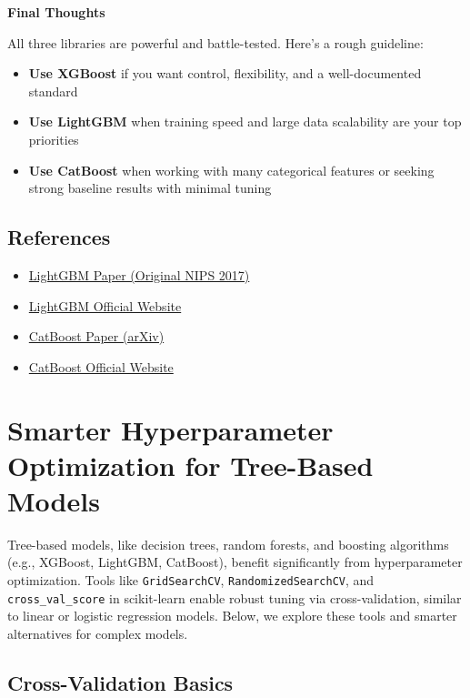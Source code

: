 \documentclass[
  letterpaper,
  DIV=11,
  numbers=noendperiod]{scrreprt}
\providecommand{\tightlist}{%
  \setlength{\itemsep}{0pt}\setlength{\parskip}{0pt}}\usepackage{longtable,booktabs,array}
\begin{document}
\textbf{Final Thoughts}

All three libraries are powerful and battle-tested. Here's a rough
guideline:

\begin{itemize}
\tightlist
\item
  \textbf{Use XGBoost} if you want control, flexibility, and a
  well-documented standard
\item
  \textbf{Use LightGBM} when training speed and large data scalability
  are your top priorities
\item
  \textbf{Use CatBoost} when working with many categorical features or
  seeking strong baseline results with minimal tuning
\end{itemize}

\section{References}\label{references}

\begin{itemize}
\tightlist
\item
  \href{https://papers.nips.cc/paper_files/paper/2017/file/6449f44a102fde848669bdd9eb6b76fa-Paper.pdf}{LightGBM
  Paper (Original NIPS 2017)}
\item
  \href{https://lightgbm.readthedocs.io/}{LightGBM Official Website}
\item
  \href{https://arxiv.org/abs/1810.11363}{CatBoost Paper (arXiv)}
\item
  \href{https://catboost.ai/}{CatBoost Official Website}
\end{itemize}

\chapter{Smarter Hyperparameter Optimization for Tree-Based
Models}\label{smarter-hyperparameter-optimization-for-tree-based-models}

Tree-based models, like decision trees, random forests, and boosting
algorithms (e.g., XGBoost, LightGBM, CatBoost), benefit significantly
from hyperparameter optimization. Tools like \texttt{GridSearchCV},
\texttt{RandomizedSearchCV}, and \texttt{cross\_val\_score} in
scikit-learn enable robust tuning via cross-validation, similar to
linear or logistic regression models. Below, we explore these tools and
smarter alternatives for complex models.

\section{Cross-Validation Basics}\label{cross-validation-basics}
\end{document}
